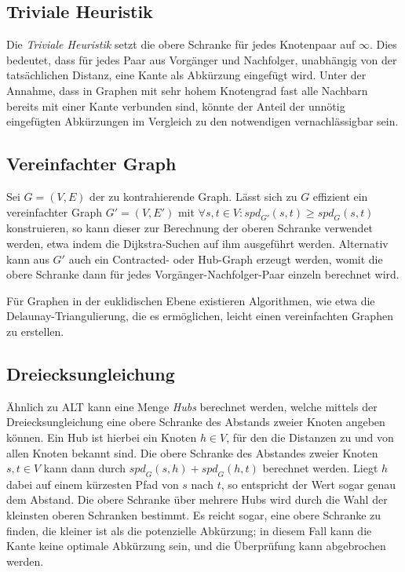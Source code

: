 \subsection{Triviale Heuristik}

Die \emph{Triviale Heuristik} setzt die obere Schranke für jedes Knotenpaar auf $\infty$.
Dies bedeutet, dass für jedes Paar aus Vorgänger und Nachfolger, unabhängig von der tatsächlichen Distanz, eine Kante als Abkürzung eingefügt wird.
Unter der Annahme, dass in Graphen mit sehr hohem Knotengrad fast alle Nachbarn bereits mit einer Kante verbunden sind, könnte der Anteil der unnötig eingefügten Abkürzungen im Vergleich zu den notwendigen vernachlässigbar sein.

\subsection{Vereinfachter Graph}

Sei $G = (V, E)$ der zu kontrahierende Graph.
Lässt sich zu $G$ effizient ein vereinfachter Graph $G' = (V, E')$ mit $\forall s, t \in V \colon {spd}_{G'} (s, t) \geq {spd}_{G} (s, t)$ konstruieren, so kann dieser zur Berechnung der oberen Schranke verwendet werden, etwa indem die Dijkstra-Suchen auf ihm ausgeführt werden.
Alternativ kann aus $G'$ auch ein Contracted- oder Hub-Graph erzeugt werden, womit die obere Schranke dann für jedes Vorgänger-Nachfolger-Paar einzeln berechnet wird.

Für Graphen in der euklidischen Ebene existieren Algorithmen, wie etwa die Delaunay-Triangulierung, die es ermöglichen, leicht einen vereinfachten Graphen zu erstellen.

\subsection{Dreiecksungleichung}

Ähnlich zu ALT\cite{goldberg2005computing} kann eine Menge \emph{Hubs} berechnet werden, welche mittels der Dreiecksungleichung eine obere Schranke des Abstands zweier Knoten angeben können.
Ein Hub ist hierbei ein Knoten $h \in V$, für den die Distanzen zu und von allen Knoten bekannt sind.
Die obere Schranke des Abstandes zweier Knoten $s, t \in V$ kann dann durch ${spd}_G (s, h) + {spd}_G (h, t)$ berechnet werden.
Liegt $h$ dabei auf einem kürzesten Pfad von $s$ nach $t$, so entspricht der Wert sogar genau dem Abstand.
Die obere Schranke über mehrere Hubs wird durch die Wahl der kleinsten oberen Schranken bestimmt.
Es reicht sogar, eine obere Schranke zu finden, die kleiner ist als die potenzielle Abkürzung; in diesem Fall kann die Kante keine optimale Abkürzung sein, und die Überprüfung kann abgebrochen werden.

